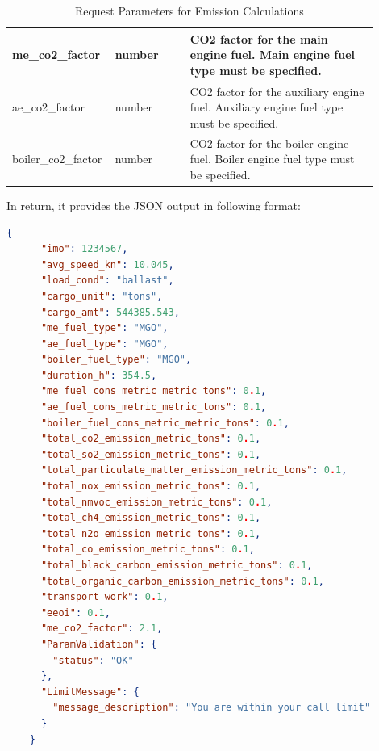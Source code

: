 \begin{table}[h]
\begin{tabular}{|p{0.2\linewidth}|p{0.2\linewidth}|p{0.5\linewidth}|}
        \hline
        me\_co2\_factor     & number        & CO2 factor for the main engine fuel. Main engine fuel type must be specified.                                                 \\
        \hline
        ae\_co2\_factor     & number        & CO2 factor for the auxiliary engine fuel. Auxiliary engine fuel type must be specified.                                       \\
        \hline
        boiler\_co2\_factor & number        & CO2 factor for the boiler engine fuel. Boiler engine fuel type must be specified.                                             \\
        \hline
    \end{tabular}
    \caption{Request Parameters for Emission Calculations}
    \label{tab:request-parameters}
\end{table}

In return, it provides the JSON output in following format:


\begin{lstlisting}[language=JSON, caption=JSON output format from emission api]
    {
      "imo": 1234567,
      "avg_speed_kn": 10.045,
      "load_cond": "ballast",
      "cargo_unit": "tons",
      "cargo_amt": 544385.543,
      "me_fuel_type": "MGO",
      "ae_fuel_type": "MGO",
      "boiler_fuel_type": "MGO",
      "duration_h": 354.5,
      "me_fuel_cons_metric_metric_tons": 0.1,
      "ae_fuel_cons_metric_metric_tons": 0.1,
      "boiler_fuel_cons_metric_metric_tons": 0.1,
      "total_co2_emission_metric_tons": 0.1,
      "total_so2_emission_metric_tons": 0.1,
      "total_particulate_matter_emission_metric_tons": 0.1,
      "total_nox_emission_metric_tons": 0.1,
      "total_nmvoc_emission_metric_tons": 0.1,
      "total_ch4_emission_metric_tons": 0.1,
      "total_n2o_emission_metric_tons": 0.1,
      "total_co_emission_metric_tons": 0.1,
      "total_black_carbon_emission_metric_tons": 0.1,
      "total_organic_carbon_emission_metric_tons": 0.1,
      "transport_work": 0.1,
      "eeoi": 0.1,
      "me_co2_factor": 2.1,
      "ParamValidation": {
        "status": "OK"
      },
      "LimitMessage": {
        "message_description": "You are within your call limit"
      }
    }
    \end{lstlisting}


